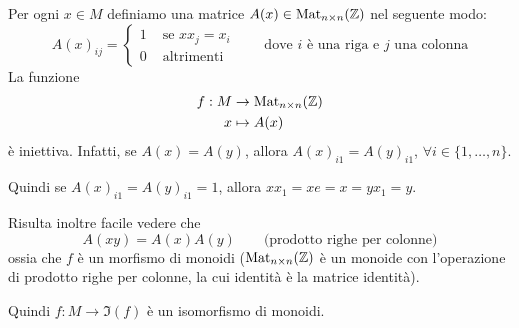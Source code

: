 \documentclass[../main.tex]{subfiles}
\begin{document}
Per ogni $x \in M$ definiamo una matrice $A(x) \in \operatorname{Mat}_{n \times n}(\mathbb{Z})$ nel seguente modo:
\[
    A(x)_{ij} =
    \begin{cases}
        1 & \text{ se } x x_j = x_i \\
        0 & \text{ altrimenti}
    \end{cases}
    \qquad
    \text{dove $i$ è una riga e $j$ una colonna}
\]
La funzione
\begin{align*}
    f: M & \rightarrow \operatorname{Mat}_{n \times n}(\mathbb{Z}) \\
    x    & \mapsto A(x)
\end{align*}
è iniettiva. Infatti, se $A(x) = A(y)$, allora $A(x)_{i1} = A(y)_{i1}$, $\forall i \in \{1,\ldots,n\}$.

Quindi se $A(x)_{i1} = A(y)_{i1} = 1$, allora $xx_1 = xe = x = yx_1 = y$.

Risulta inoltre facile vedere che
\[
    A(xy) = A(x)A(y) \qquad \text{(prodotto righe per colonne)}
\]
ossia che $f$ è un morfismo di monoidi ($\operatorname{Mat}_{n \times n}(\mathbb{Z})$ è un monoide con l'operazione di prodotto righe per colonne, la cui identità è la matrice identità).

Quindi $f: M \rightarrow \Im(f)$ è un isomorfismo di monoidi.
\end{document}
